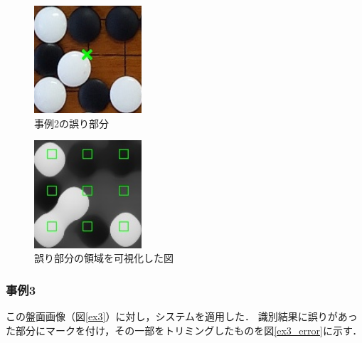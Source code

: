 \documentclass[openright]{nitocs}
\numberwithin{equation}{section}
\begin{document}
                \begin{figure}[tb] %
                    \begin{center}
                    \includegraphics[clip,width=40mm]{DSC_0099/TRIM_resultCompare.jpg} 
                    \caption{事例2の誤り部分}
                    \label{ex2_error}
                    \end{center}
                \end{figure}

                \begin{figure}[tb] %
                    \begin{center}
                    \includegraphics[clip,width=40mm]{DSC_0099/TRIM_boardWithAreaImg.jpg} 
                    \caption{誤り部分の領域を可視化した図}
                    \label{ex2_error_area}
                    \end{center}
                \end{figure}

            \subsubsection{事例3} %
                この盤面画像（図\ref{ex3}）に対し，システムを適用した．
                識別結果に誤りがあった部分にマークを付け，その一部をトリミングしたものを図\ref{ex3_error}に示す．
\end{document}
